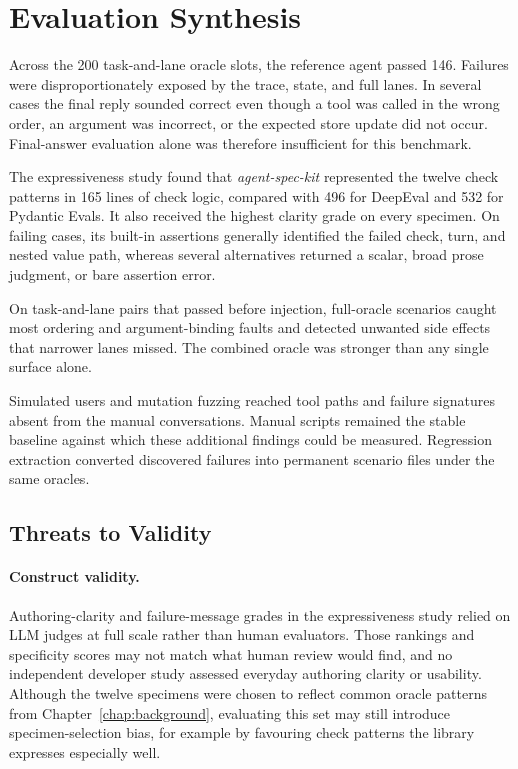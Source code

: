 \section{Evaluation Synthesis}
\label{sec:evaluation-summary}

Across the 200 task-and-lane oracle slots, the reference agent passed 146. Failures were disproportionately exposed by the trace, state, and full lanes. In several cases the final reply sounded correct even though a tool was called in the wrong order, an argument was incorrect, or the expected store update did not occur. Final-answer evaluation alone was therefore insufficient for this benchmark.

The expressiveness study found that \emph{agent-spec-kit} represented the twelve check patterns in 165 lines of check logic, compared with 496 for DeepEval and 532 for Pydantic Evals. It also received the highest clarity grade on every specimen. On failing cases, its built-in assertions generally identified the failed check, turn, and nested value path, whereas several alternatives returned a scalar, broad prose judgment, or bare assertion error.

On task-and-lane pairs that passed before injection, full-oracle scenarios caught most ordering and argument-binding faults and detected unwanted side effects that narrower lanes missed. The combined oracle was stronger than any single surface alone.

Simulated users and mutation fuzzing reached tool paths and failure signatures absent from the manual conversations. Manual scripts remained the stable baseline against which these additional findings could be measured. Regression extraction converted discovered failures into permanent scenario files under the same oracles.

\subsection{Threats to Validity}
\label{sec:evaluation-limitations}

\paragraph{Construct validity.}
Authoring-clarity and failure-message grades in the expressiveness study relied on LLM judges at full scale rather than human evaluators. Those rankings and specificity scores may not match what human review would find, and no independent developer study assessed everyday authoring clarity or usability. Although the twelve specimens were chosen to reflect common oracle patterns from Chapter~\ref{chap:background}, evaluating this set may still introduce specimen-selection bias, for example by favouring check patterns the library expresses especially well.

